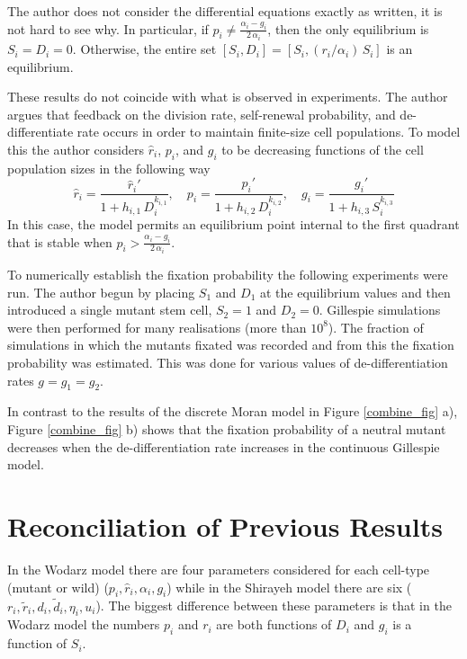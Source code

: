 \documentclass[12pt]{article}
\begin{document}
The author does not consider the differential equations exactly as written, it is not hard to see why. In particular, if $p_i\neq \frac{\alpha_i-g_i}{2\,\alpha_i}$, then the only equilibrium is $S_i=D_i=0$. Otherwise, the entire set $[S_i,D_i]=[S_i,(r_i/\alpha_i)\,S_i]$ is an equilibrium. 

These results do not coincide with what is observed in experiments. The author argues that feedback on the division rate, self-renewal probability, and de-differentiate rate occurs in order to maintain finite-size cell populations. To model this the author considers $\hat{r}_i$, $p_i$, and $g_i$ to be decreasing functions of the cell population sizes in the following way
\[
\hat{r}_i=\frac{\hat{r}_i'}{1+h_{i,1}\,D_i^{k_{i,1}}}, \quad p_i=\frac{p_i'}{1+h_{i,2}\,D_i^{k_{i,2}}}, \quad g_i=\frac{g_i'}{1+h_{i,3}\,S_i^{k_{i,3}}}
\]
In this case, the model permits an equilibrium point internal to the first quadrant that is stable when $p_i>\frac{\alpha_i-g_i}{2\,\alpha_i}$.

To numerically establish the fixation probability the following experiments were run. The author begun by placing $S_1$ and $D_1$ at the equilibrium values and then introduced a single mutant stem cell, $S_2=1$ and $D_2=0$. Gillespie simulations were then performed \cite{gillespie} for many realisations (more than $10^8$). The fraction of simulations in which the mutants fixated was recorded and from this the fixation probability was estimated. This was done for various values of de-differentiation rates $g=g_1=g_2$.

In contrast to the results of the discrete Moran model in Figure \ref{combine_fig} a), Figure \ref{combine_fig} b) shows that the fixation probability of a neutral mutant decreases when the de-differentiation rate increases in the continuous Gillespie model.

\section{Reconciliation of Previous Results}\label{recon}

In the Wodarz model there are four parameters considered for each cell-type (mutant or wild) ($p_i, \hat{r}_i, \alpha_i, g_i$) while in the Shirayeh model there are six ($r_i,\tilde{r}_i, d_i, \tilde{d}_i, \eta_i, u_i$). The biggest difference between these parameters is that in the Wodarz model the numbers $p_i$ and $r_i$ are both functions of $D_i$ and $g_i$ is a function of $S_i$.
\end{document}
